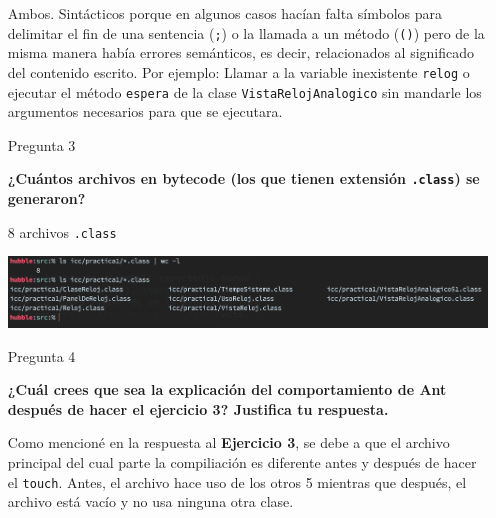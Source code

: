 \documentclass[11pt,letterpaper]{article}
\begin{document}
\begin{enumerate}
        Ambos. Sintácticos porque en algunos casos hacían falta símbolos para delimitar
        el fin de una sentencia (\texttt{;}) o la llamada a un método (\texttt{()}) pero
        de la misma manera había errores semánticos, es decir, relacionados al significado
        del contenido escrito. Por ejemplo: Llamar a la variable inexistente \texttt{relog}
        o ejecutar el método \texttt{espera} de la clase \texttt{VistaRelojAnalogico} sin
        mandarle los argumentos necesarios para que se ejecutara.

    \item [Pregunta 3] {\bfseries ¿Cuántos archivos en bytecode (los que tienen extensión
    \texttt{.class}) se generaron?\par}

        8 archivos \texttt{.class}

        \begin{center}
            \includegraphics[scale=.4]{assets/img/canek-p-3.png}
        \end{center}

    \item [Pregunta 4] {\bfseries ¿Cuál crees que sea la explicación del comportamiento de
    Ant después de hacer el ejercicio 3? Justifica tu respuesta.\par}

        Como mencioné en la respuesta al \textbf{Ejercicio 3}, se debe a que el archivo
        principal del cual parte la compiliación es diferente antes y después de hacer
        el \texttt{touch}. Antes, el archivo hace uso de los otros 5 mientras que después,
        el archivo está vacío y no usa ninguna otra clase.
\end{enumerate}
\end{document}
